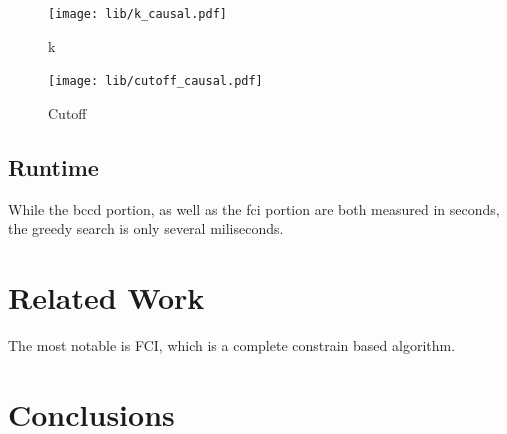 \documentclass[11pt,a4paper]{report}
\begin{document}
\begin{figure}
  \centering
  \texttt{[image: lib/k\_causal.pdf]}
  \caption{k}
  \label{fig:k_causal}
\end{figure}

\begin{figure}
  \centering
  \texttt{[image: lib/cutoff\_causal.pdf]}
  \caption{Cutoff}
  \label{fig:cutoff_causal}
\end{figure}

\section{Runtime}\label{runtime}
While the bccd portion, as well as the fci portion are both measured in
seconds, the greedy search is only several miliseconds.

\chapter{Related Work}\label{relatedwork}
The most notable is
FCI\cite{spirtesCausationPredictionSearch2000}, which is a complete
\cite{zhangCompletenessOrientationRules2008} constrain based algorithm.


\chapter{Conclusions}\label{conclusions}

\printbibliography


\end{document}
